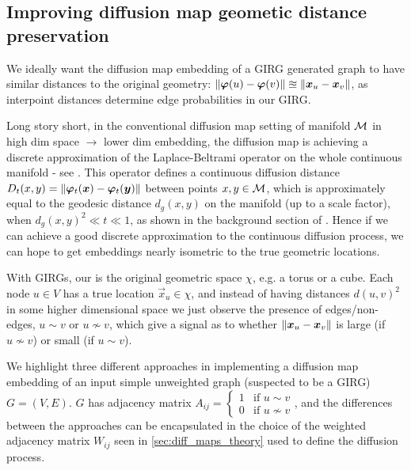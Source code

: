 \subsection{Improving diffusion map geometic distance preservation}
\label{sec:diff_map_geometry}
We ideally want the diffusion map embedding of a GIRG generated graph to have similar distances to the original geometry: $\left\lVert \bm{\varphi}(u) - \bm{\varphi}(v)\right\rVert \approxeq \left\lVert \bm{x}_u - \bm{x}_v\right\rVert$, as interpoint distances determine edge probabilities in our GIRG.



Long story short, in the conventional diffusion map setting of manifold $\mathcal{M}$ in high dim space $\to$ lower dim embedding, the diffusion map is achieving a discrete approximation of the Laplace-Beltrami operator on the whole continuous manifold - see \cite{singer2006graph}. This operator defines a continuous diffusion distance $D_t(x, y) = \left\lVert \bm{\varphi}_t(\bm{x}) - \bm{\varphi}_t(\bm{y})\right\rVert$ between points $x, y \in \mathcal{M}$, which is approximately equal to the geodesic distance $d_g(x, y)$ on the manifold (up to a scale factor), when $d_g(x, y)^2 \ll t \ll 1$, as shown in the background section of \cite{berry2018iterated}. Hence if we can achieve a good discrete approximation to the continuous diffusion process, we can hope to get embeddings nearly isometric to the true geometric locations.

With GIRGs, our  is the original geometric space $\chi$, e.g. a torus or a cube. Each node $u \in V$ has a true location $\vec{x}_u \in \chi$, and instead of having distances $d(u, v)^2$ in some higher dimensional space we just observe the presence of edges/non-edges, $u \sim v$ or $u \nsim v$, which give a signal as to whether $\left\lVert \bm{x}_u - \bm{x}_v\right\rVert$ is large (if $u \nsim v$) or small (if $u \sim v$).

We highlight three different approaches in implementing a diffusion map embedding of an input simple unweighted graph (suspected to be a GIRG) $G=(V, E)$.
$G$ has adjacency matrix $A_{ij} = \begin{cases} 1 & \text{if } u \sim v \\ 0 & \text{if } u \nsim v \end{cases}$, and the differences between the approaches can be encapsulated in the choice of the weighted adjacency matrix $W_{ij}$ seen in \cref{sec:diff_maps_theory} used to define the diffusion process.

